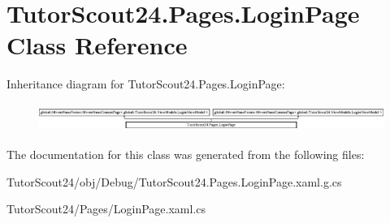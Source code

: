 \hypertarget{class_tutor_scout24_1_1_pages_1_1_login_page}{}\section{Tutor\+Scout24.\+Pages.\+Login\+Page Class Reference}
\label{class_tutor_scout24_1_1_pages_1_1_login_page}
Inheritance diagram for Tutor\+Scout24.\+Pages.\+Login\+Page\+:\begin{figure}[H]
\begin{center}
\leavevmode
\includegraphics[height=0.916530cm]{class_tutor_scout24_1_1_pages_1_1_login_page}
\end{center}
\end{figure}


The documentation for this class was generated from the following files\+:\begin{DoxyCompactItemize}
\item 
Tutor\+Scout24/obj/\+Debug/Tutor\+Scout24.\+Pages.\+Login\+Page.\+xaml.\+g.\+cs\item 
Tutor\+Scout24/\+Pages/Login\+Page.\+xaml.\+cs\end{DoxyCompactItemize}
